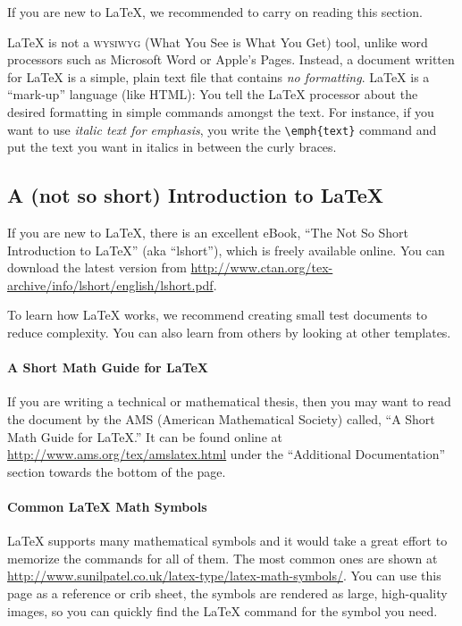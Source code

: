 If you are new to LaTeX, we recommended to carry on reading this section.

LaTeX is not a \textsc{wysiwyg} (What You See is What You Get) tool, unlike word processors such as Microsoft Word or Apple's Pages. Instead, a document written for LaTeX is a simple, plain text file that contains \emph{no formatting}. LaTeX is a \enquote{mark-up} language (like HTML): You tell the LaTeX processor about the desired formatting in simple commands amongst the text. For instance, if you want to use \emph{italic text for emphasis}, you write the \verb|\emph{text}| command and put the text you want in italics in between the curly braces.

\subsection{A (not so short) Introduction to LaTeX}

If you are new to LaTeX, there is an excellent eBook, \enquote{The Not So Short Introduction to LaTeX} (aka ``lshort''), which is freely available online. You can download the latest version from
\url{http://www.ctan.org/tex-archive/info/lshort/english/lshort.pdf}.

To learn how LaTeX works, we recommend creating small test documents to reduce complexity. You can also learn from others by looking at other templates.

\paragraph{A Short Math Guide for LaTeX}

If you are writing a technical or mathematical thesis, then you may want to read the document by the AMS (American Mathematical Society) called, \enquote{A Short Math Guide for LaTeX.} It can be found online at
\url{http://www.ams.org/tex/amslatex.html}
under the \enquote{Additional Documentation} section towards the bottom of the page.

\paragraph{Common LaTeX Math Symbols}
LaTeX supports many mathematical symbols and it would take a great effort to memorize the commands for all of them. The most common ones are shown at
\url{http://www.sunilpatel.co.uk/latex-type/latex-math-symbols/}.
You can use this page as a reference or crib sheet, the symbols are rendered as large, high-quality images, so you can quickly find the LaTeX command for the symbol you need.

